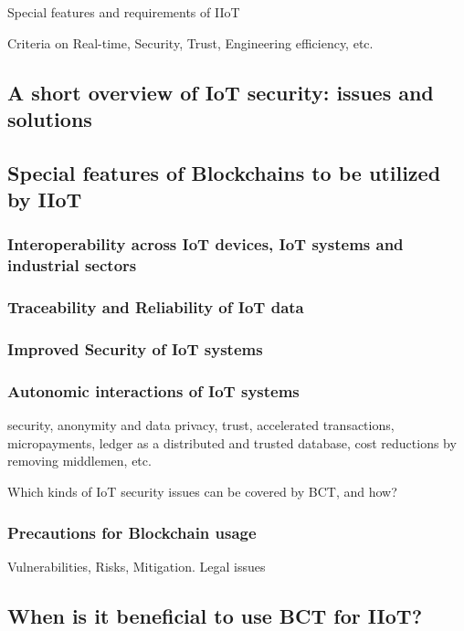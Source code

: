 \documentclass[a4paper]{article}
\begin{document}
Special features and requirements of IIoT

Criteria on Real-time, Security, Trust, Engineering efficiency, etc.

\subsection{A short overview of IoT security: issues and solutions}

\subsection{Special features of Blockchains to be utilized by IIoT}

\subsubsection{Interoperability across IoT devices, IoT systems and industrial sectors}
\subsubsection{Traceability and Reliability of IoT data}
\subsubsection{Improved Security of IoT systems}
\subsubsection{Autonomic interactions of IoT systems}

security, anonymity and data privacy, trust, accelerated transactions, micropayments, ledger as a distributed and trusted database, cost reductions by removing middlemen, etc.

Which kinds of IoT security issues can be covered by BCT, and how?

\subsubsection{Precautions for Blockchain usage}

Vulnerabilities, Risks, Mitigation. Legal issues

\subsection{When is it beneficial to use BCT for IIoT?}
\end{document}
